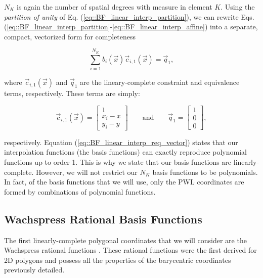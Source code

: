 \noindent $N_K$ is again the number of spatial degrees with measure in element $K$. Using the {\em partition of unity} of Eq. (\ref{eq::BF_linear_interp_partition}), we can rewrite Eqs. (\ref{eq::BF_linear_interp_partition}-\ref{eq::BF_linear_interp_affine}) into a separate, compact, vectorized form for completeness

\begin{equation}
\sum_{i=1}^{N_K}  b_i (\vec{x}) \vec{c}_{i,1}(\vec{x}) = \vec{q}_1 ,
\label{eq::BF_linear_interp_req_vector}
\end{equation}

\noindent where $\vec{c}_{i,1}(\vec{x})$ and $\vec{q}_1$ are the lineary-complete constraint and equivalence terms, respectively. These terms are simply:

\begin{equation}
\vec{c}_{i,1}(\vec{x}) = \left[
\begin{array}{c}
1 \\
x_i - x \\
y_i - y
\end{array} \right]
  \qquad \text{and} \qquad \vec{q}_1 = \left[
\begin{array}{c}
1 \\
0 \\
0
\end{array} \right],
\label{eq::BF_linear_constraint_terms}
\end{equation}

\noindent respectively. Equation (\ref{eq::BF_linear_interp_req_vector}) states that our interpolation functions (the basis functions) can exactly reproduce polynomial functions up to order 1. This is why we state that our basis functions are linearly-complete. However, we will not restrict our $N_K$ basis functions to be polynomials. In fact, of the basis functions that we will use, only the PWL coordinates are formed by combinations of polynomial functions.


\subsection{Wachspress Rational Basis Functions}
\label{sec::BF_2DLinear_Wachspress}

The first linearly-complete polygonal coordinates that we will consider are the Wachspress rational functions \cite{wachspress1975rational}. These rational functions were the first derived for 2D polygons and possess all the properties of the barycentric coordinates previously detailed.

